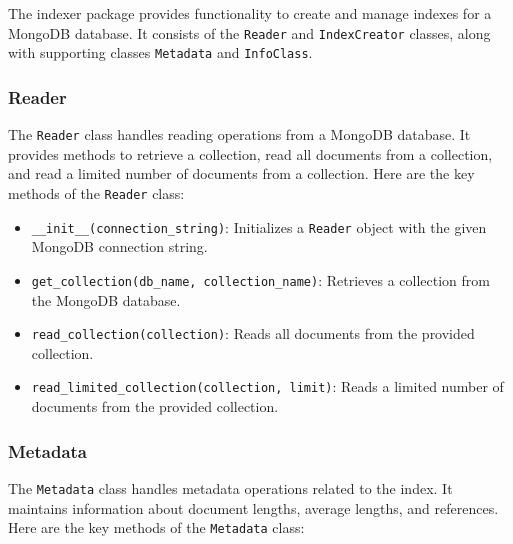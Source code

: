 \documentclass{article}
\begin{document}
The indexer package provides functionality to create and manage indexes for a MongoDB database. It consists of the \texttt{Reader} and \texttt{IndexCreator} classes, along with supporting classes \texttt{Metadata} and \texttt{InfoClass}.

\subsubsection{Reader}

The \texttt{Reader} class handles reading operations from a MongoDB database. It provides methods to retrieve a collection, read all documents from a collection, and read a limited number of documents from a collection. Here are the key methods of the \texttt{Reader} class:

\begin{itemize}
    \item \texttt{\_\_init\_\_(connection\_string)}: Initializes a \texttt{Reader} object with the given MongoDB connection string.
    \item \texttt{get\_collection(db\_name, collection\_name)}: Retrieves a collection from the MongoDB database.
    \item \texttt{read\_collection(collection)}: Reads all documents from the provided collection.
    \item \texttt{read\_limited\_collection(collection, limit)}: Reads a limited number of documents from the provided collection.
\end{itemize}

\subsubsection{Metadata}

The \texttt{Metadata} class handles metadata operations related to the index. It maintains information about document lengths, average lengths, and references. Here are the key methods of the \texttt{Metadata} class:
\end{document}
